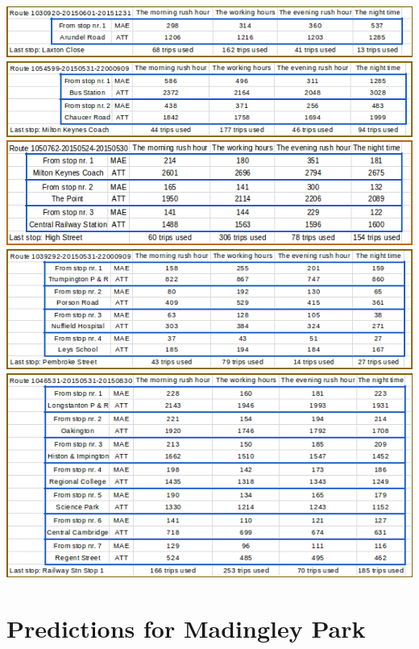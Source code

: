 \documentclass[12pt,a4paper,oneside,openright]{report}
\begin{document}
\includegraphics[width=\textwidth]{figs/table_of_1030920.png}
\includegraphics[width=\textwidth]{figs/table_of_1054599.png}
\includegraphics[width=\textwidth]{figs/table_of_1050762.png}
\includegraphics[width=\textwidth]{figs/table_of_1039292.png}
\includegraphics[width=\textwidth]{figs/table_of_1046531.png}

\newpage

\section{Predictions for Madingley Park}

\label{B2}
\end{document}
